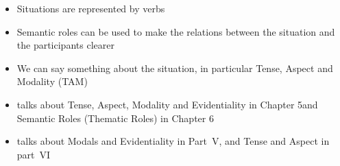 \documentclass[a4paper,landscape,headrule,footrule,xetex]{foils}
\begin{document}
\begin{itemize}
\item Situations are represented by verbs
\item Semantic roles can be used to make the relations between the situation and the participants clearer
\item We can say something about the situation, in particular Tense, Aspect and Modality (TAM)
\item \citet{Saeed:2015} talks about Tense, Aspect, Modality and Evidentiality in Chapter 5and Semantic Roles (Thematic Roles) in  Chapter 6
\item  \citet{Kroeger:2022} talks about Modals and Evidentiality in Part~V, and Tense and Aspect in part~VI
\end{itemize}

\small



\end{document}
